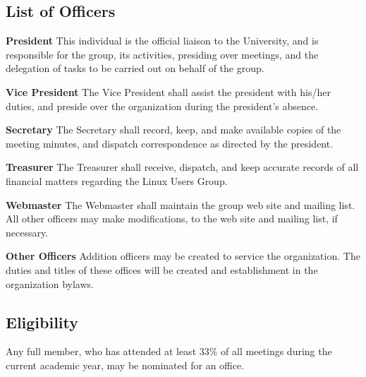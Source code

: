 \documentclass{article}
\begin{document}
\subsection{List of Officers}
\begin{description}
\item{\textbf{President}}
This individual is the official liaison to the University, and is responsible for the group, its activities, presiding over meetings, and the delegation of tasks to be carried out on behalf of the group.
\item{\textbf{Vice President}}
The Vice President shall assist the president with his/her duties, and preside over the organization during the president's absence.
\item{\textbf{Secretary}}
The Secretary shall record, keep, and make available copies of the meeting minutes, and dispatch correspondence as directed by the president.
\item{\textbf{Treasurer}}
The Treasurer shall receive, dispatch, and keep accurate records of all financial matters regarding the Linux Users Group.
\item{\textbf{Webmaster}}
The Webmaster shall maintain the group web site and mailing list.  All other officers may make modifications, to the web site and mailing list, if necessary.
\item{\textbf{Other Officers}}
Addition officers may be created to service the organization. The duties and titles of these offices will be created and establishment in the organization bylaws.
\end{description}
\subsection{Eligibility}
Any full member, who has attended at least 33\% of all meetings during the current academic year, may be nominated for an office.
\end{document}
